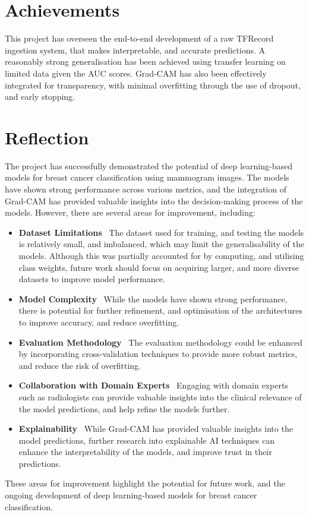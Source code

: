 \documentclass[../main]{subfiles}
\begin{document}
\section{Achievements}
This project has overseen the end-to-end development of a raw TFRecord ingestion system, that makes interpretable, and accurate predictions. A reasonably strong generalisation has been achieved using transfer learning on limited data given the AUC scores. Grad-CAM has also been effectively integrated for transparency, with minimal overfitting through the use of dropout, and early stopping.

\section{Reflection}
\label{sec:reflection}
The project has successfully demonstrated the potential of deep learning-based models for breast cancer classification using mammogram images. The models have shown strong performance across various metrics, and the integration of Grad-CAM has provided valuable insights into the decision-making process of the models. However, there are several areas for improvement, including:
\begin{itemize}
    \item \textbf{Dataset Limitations} \textemdash\ The dataset used for training, and testing the models is relatively small, and imbalanced, which may limit the generalisability of the models. Although this was partially accounted for by computing, and utilising class weights, future work should focus on acquiring larger, and more diverse datasets to improve model performance.
    \item \textbf{Model Complexity} \textemdash\ While the models have shown strong performance, there is potential for further refinement, and optimisation of the architectures to improve accuracy, and reduce overfitting.
    \item \textbf{Evaluation Methodology} \textemdash\ The evaluation methodology could be enhanced by incorporating cross-validation techniques to provide more robust metrics, and reduce the risk of overfitting.
    \item \textbf{Collaboration with Domain Experts} \textemdash\ Engaging with domain experts such as radiologists can provide valuable insights into the clinical relevance of the model predictions, and help refine the models further.
    \item \textbf{Explainability} \textemdash\ While Grad-CAM has provided valuable insights into the model predictions, further research into explainable AI techniques can enhance the interpretability of the models, and improve trust in their predictions.
\end{itemize}
These areas for improvement highlight the potential for future work, and the ongoing development of deep learning-based models for breast cancer classification.
\end{document}
